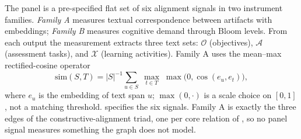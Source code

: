 The panel is a pre-specified flat set of six alignment signals in two instrument
families. \emph{Family A} measures textual correspondence between artifacts with
embeddings; \emph{Family B} measures cognitive demand through Bloom levels. From
each output the measurement extracts three text sets: $\mathcal{O}$ (objectives),
$\mathcal{A}$ (assessment tasks), and $\mathcal{X}$ (learning activities). Family A
uses the mean--max rectified-cosine operator
\[
  \mathrm{sim}(S,T)
  = |S|^{-1}\sum_{u\in S}\;\max_{t\in T}\;\max\bigl(0,\cos(e_u,e_t)\bigr),
\]
where $e_u$ is the embedding of text span $u$; $\max(0,\cdot)$ is a scale choice on
$[0,1]$, not a matching threshold.  specifies the six signals.
Family A is exactly the three edges of the constructive-alignment triad, one per core
relation of , so no panel signal measures something the graph does
not model.

